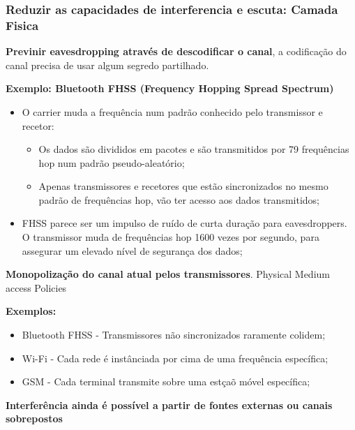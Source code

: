 \documentclass{article}
\begin{document}
\subsubsection{Reduzir as capacidades de interferencia e escuta: Camada Fisica}

\begin{flushleft}
  \textbf{Previnir eavesdropping através de descodificar o canal},
  a codificação do canal precisa de usar algum segredo partilhado.

  \vspace{2mm}

  \textbf{Exemplo: Bluetooth FHSS (Frequency Hopping Spread Spectrum)}
  \begin{itemize}
    \item O carrier muda a frequência num padrão conhecido pelo transmissor e recetor:
    \begin{itemize}
      \item Os dados são divididos em pacotes e são transmitidos por 79 frequências hop num padrão pseudo-aleatório;
      \item Apenas transmissores e recetores que estão sincronizados no mesmo padrão
      de frequências hop, vão ter acesso aos dados transmitidos;
    \end{itemize}

    \item FHSS parece ser um impulso de ruído de curta duração para eavesdroppers. O transmissor muda de frequências
    hop 1600 vezes por segundo, para assegurar um elevado nível de segurança dos dados;
  \end{itemize}

  \textbf{Monopolização do canal atual pelos transmissores}. Physical Medium access Policies

  \vspace{2mm}

  \textbf{Exemplos:}
  \begin{itemize}
    \item Bluetooth FHSS - Transmissores não sincronizados raramente colidem;
    \item Wi-Fi - Cada rede é instânciada por cima de uma frequência específica;
    \item GSM - Cada terminal transmite sobre uma estçaõ móvel específica;
  \end{itemize}
\end{flushleft}

\begin{center}
  \textbf{Interferência ainda é possível a partir de fontes externas
  ou canais sobrepostos}
\end{center}
\end{document}
